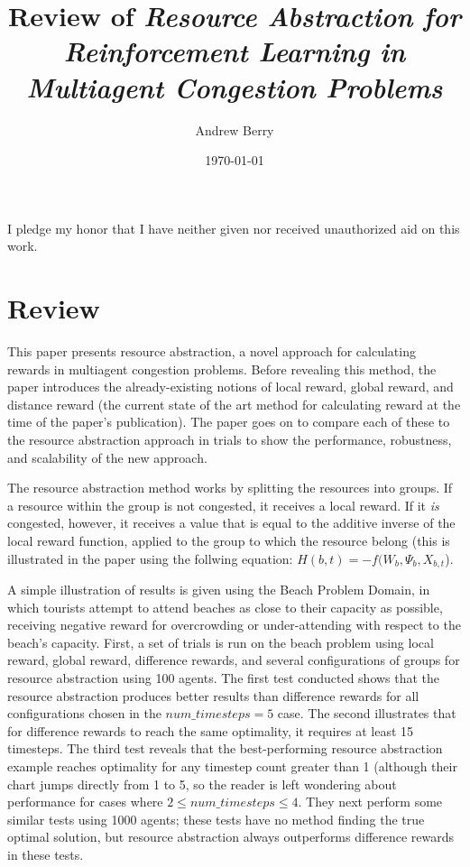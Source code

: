\documentclass{article}
\title{Review of \textit{Resource Abstraction for Reinforcement Learning in Multiagent Congestion Problems}}
\author{Andrew Berry}
\date{\today}
\begin{document}
\maketitle

I pledge my honor that I have neither given nor received unauthorized aid on this work.
\section{Review}
This paper presents resource abstraction, a novel approach for calculating rewards in multiagent congestion problems. 
Before revealing this method, the paper introduces the already-existing notions of local reward, global reward, and distance reward 
(the current state of the art method for calculating reward at the time of the paper's publication). The paper goes on to compare each of these to the resource
abstraction approach in trials to show the performance, robustness, and scalability of the new approach.

The resource abstraction method works by splitting the resources into groups. If a resource within the group is not congested, it receives a local reward. If it \textit{is} congested, however, it receives a value that is equal to the additive inverse of the local reward function, applied to the group to which the resource belong (this is illustrated in the paper using the follwing equation: $ H(b,t) = {-f}(W_b,\Psi_b,X_{b,t} $).

A simple illustration of results is given using the Beach Problem Domain, in which tourists attempt to attend beaches as close to their capacity as possible, receiving negative 
reward for overcrowding or under-attending with respect to the beach's capacity. First, a set of trials is run on the beach problem using local reward, global reward, difference 
rewards, and several configurations of groups for resource abstraction using 100 agents. The first test conducted shows that the resource abstraction produces better results than 
difference rewards for all configurations chosen in the $ num\_timesteps = 5 $ case. The second illustrates that for difference rewards to reach the same optimality, it requires at 
least 15 timesteps.  The third test reveals that the best-performing resource abstraction example reaches optimality for any timestep count greater than 1 (although their chart jumps 
directly from 1 to 5, so the reader is left wondering about performance for cases where $ 2 \le num\_timesteps \le 4 $. They next perform some similar tests using 1000 agents; these 
tests have no method finding the true optimal solution, but resource abstraction always outperforms difference rewards in these tests.
\end{document}
